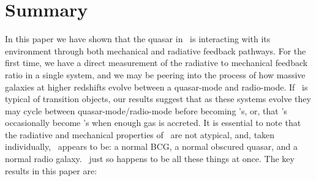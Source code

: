 \documentclass[referee,traditabstract]{aa}
\begin{document}
\section{Summary}
\label{sec:summ}

In this paper we have shown that the quasar in \inine\ is interacting
with its environment through both mechanical and radiative feedback
pathways. For the first time, we have a direct measurement of the
radiative to mechanical feedback ratio in a single system, and we may
be peering into the process of how massive galaxies at higher
redshifts evolve between a quasar-mode and radio-mode. If \irs\ is
typical of transition objects, our results suggest that as these
systems evolve they may cycle between quasar-mode/radio-mode before
becoming \fri's, or, that \fri's occasionally become \frii's when
enough gas is accreted. It is essential to note that the radiative and
mechanical properties of \irs\ are not atypical, and, taken
individually, \irs\ appears to be: a normal BCG, a normal obscured
quasar, and a normal radio galaxy. \irs\ just so happens to be all
these things at once. The key results in this paper are:
\end{document}
